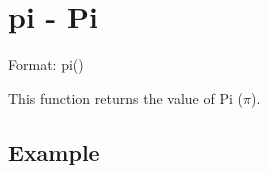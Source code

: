 
%

\section{pi - Pi\label{sect:pi}}

Format: pi()

This function returns the value of Pi ($\pi$).


\subsection*{Example}


%

